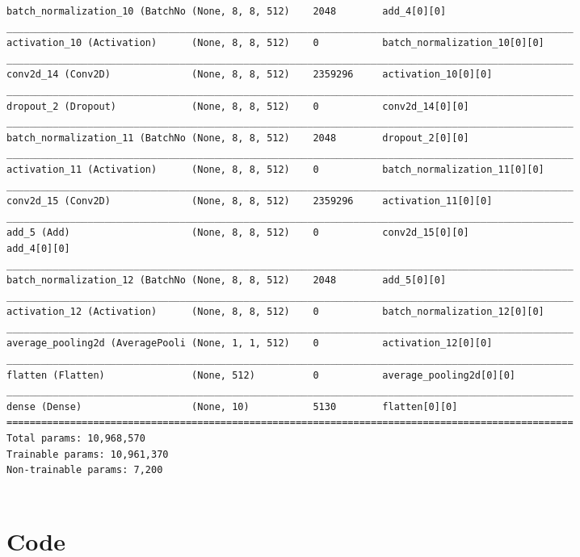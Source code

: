 \documentclass[12pt]{article}
\begin{document}
\begin{adjustwidth}{-50pt}{0pt}
\begin{Verbatim}
batch_normalization_10 (BatchNo (None, 8, 8, 512)    2048        add_4[0][0]
__________________________________________________________________________________________________
activation_10 (Activation)      (None, 8, 8, 512)    0           batch_normalization_10[0][0]
__________________________________________________________________________________________________
conv2d_14 (Conv2D)              (None, 8, 8, 512)    2359296     activation_10[0][0]
__________________________________________________________________________________________________
dropout_2 (Dropout)             (None, 8, 8, 512)    0           conv2d_14[0][0]
__________________________________________________________________________________________________
batch_normalization_11 (BatchNo (None, 8, 8, 512)    2048        dropout_2[0][0]
__________________________________________________________________________________________________
activation_11 (Activation)      (None, 8, 8, 512)    0           batch_normalization_11[0][0]
__________________________________________________________________________________________________
conv2d_15 (Conv2D)              (None, 8, 8, 512)    2359296     activation_11[0][0]
__________________________________________________________________________________________________
add_5 (Add)                     (None, 8, 8, 512)    0           conv2d_15[0][0]
add_4[0][0]
__________________________________________________________________________________________________
batch_normalization_12 (BatchNo (None, 8, 8, 512)    2048        add_5[0][0]
__________________________________________________________________________________________________
activation_12 (Activation)      (None, 8, 8, 512)    0           batch_normalization_12[0][0]
__________________________________________________________________________________________________
average_pooling2d (AveragePooli (None, 1, 1, 512)    0           activation_12[0][0]
__________________________________________________________________________________________________
flatten (Flatten)               (None, 512)          0           average_pooling2d[0][0]
__________________________________________________________________________________________________
dense (Dense)                   (None, 10)           5130        flatten[0][0]
==================================================================================================
Total params: 10,968,570
Trainable params: 10,961,370
Non-trainable params: 7,200


\end{Verbatim}
\clearpage
\section{Code}


\end{adjustwidth}
\end{document}
